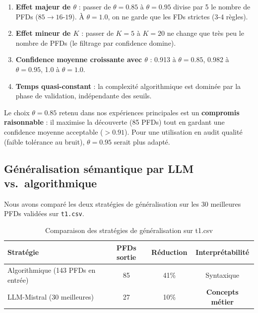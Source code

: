\documentclass[12pt,a4paper]{article}
\begin{document}
\begin{enumerate}
    \item \textbf{Effet majeur de $\theta$} : passer de $\theta = 0.85$ \`{a} $\theta = 0.95$ divise par 5 le nombre de PFDs ($85 \to 16$-$19$). \`{A} $\theta = 1.0$, on ne garde que les FDs strictes (3-4 r\`{e}gles).
    \item \textbf{Effet mineur de $K$} : passer de $K = 5$ \`{a} $K = 20$ ne change que tr\`{e}s peu le nombre de PFDs (le filtrage par confidence domine).
    \item \textbf{Confidence moyenne croissante avec $\theta$} : 0.913 \`{a} $\theta = 0.85$, 0.982 \`{a} $\theta = 0.95$, 1.0 \`{a} $\theta = 1.0$.
    \item \textbf{Temps quasi-constant} : la complexit\'{e} algorithmique est domin\'{e}e par la phase de validation, ind\'{e}pendante des seuils.
\end{enumerate}

Le choix $\theta = 0.85$ retenu dans nos exp\'{e}riences principales est un \textbf{compromis raisonnable} : il maximise la d\'{e}couverte (85 PFDs) tout en gardant une confidence moyenne acceptable ($> 0.91$). Pour une utilisation en audit qualit\'{e} (faible tol\'{e}rance au bruit), $\theta = 0.95$ serait plus adapt\'{e}.

\subsection{G\'{e}n\'{e}ralisation s\'{e}mantique par LLM vs.\ algorithmique}
\label{subsec:res-gen-llm}

Nous avons compar\'{e} les deux strat\'{e}gies de g\'{e}n\'{e}ralisation sur les 30 meilleures PFDs valid\'{e}es sur \texttt{t1.csv}.

\begin{table}[H]
\centering
\caption{Comparaison des strat\'{e}gies de g\'{e}n\'{e}ralisation sur t1.csv}
\label{tab:gen-comparison}
\small
\begin{tabular}{@{}lccc@{}}
\toprule
\textbf{Strat\'{e}gie} & \textbf{PFDs sortie} & \textbf{R\'{e}duction} & \textbf{Interpr\'{e}tabilit\'{e}} \\
\midrule
Algorithmique (143 PFDs en entr\'{e}e) & 85 & 41\% & Syntaxique \\
LLM-Mistral (30 meilleures) & 27 & 10\% & \textbf{Concepts m\'{e}tier} \\
\bottomrule
\end{tabular}
\end{table}
\end{document}
